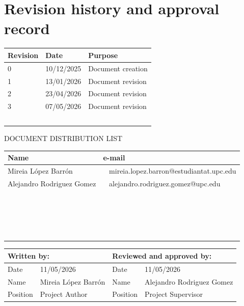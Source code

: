 \section*{Revision history and approval record}


\begin{center}

\begin{tabularx}{\textwidth}{|p{2cm}|p{2.5cm}|X|}
\hline
\textbf{Revision} &
\textbf{Date} &
\textbf{Purpose}\\\hline
0 &
10/12/2025 &
Document creation\\\hline
1 &
13/01/2026 &
Document revision\\\hline
2
 &
23/04/2026
 &
Document revision\\\hline
3
 &
07/05/2026
 &
Document revision\\\hline
~
 &
~
 &
~
\\\hline
\end{tabularx}
\end{center}



\bigskip

{
DOCUMENT DISTRIBUTION LIST}

\begin{center}
\tablefirsthead{}
\tablehead{}
\tabletail{}
\tablelasttail{}
\begin{tabularx}{\textwidth}{|X|X|}
\hline
\textbf{Name} &
\textbf{e-mail}\\\hline
{Mireia L\'opez Barr\'on} &
~ mireia.lopez.barron@estudiantat.upc.edu
\\\hline
{Alejandro Rodriguez Gomez} &
~ alejandro.rodriguez.gomez@upc.edu
\\\hline
{} &
~
\\\hline
~
 &
~
\\\hline
~
 &
~
\\\hline
~
 &
~
\\\hline
\end{tabularx}
\end{center}

\bigskip

\begin{center}
\tablefirsthead{}
\tablehead{}
\tabletail{}
\tablelasttail{}
\begin{tabularx}{\textwidth}{|p{2cm}|X|p{2cm}|X|}
\hline
\multicolumn{2}{|l|}{ Written by:} &
\multicolumn{2}{l|}{ Reviewed and approved by:}\\\hline
 Date &
 11/05/2026 &
 Date &
 11/05/2026\\\hline
 Name &
 Mireia L\'opez Barr\'on &
 Name &
 Alejandro Rodriguez Gomez\\\hline
 Position &
 Project Author &
 Position &
 Project Supervisor\\\hline
\end{tabularx}
\end{center}
